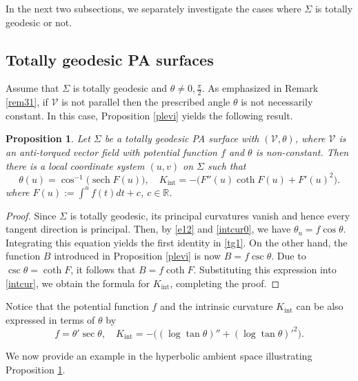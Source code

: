 \documentclass[12pt,reqno]{amsart}
\def\r{\mathbb R}
\def\v{\mathcal V}
\DeclareMathOperator{\sech}{sech}
\newtheorem{proposition}[theorem]{Proposition}
\theoremstyle{definition}
\begin{document}
In the next two subsections, we separately investigate the cases where $\Sigma$ is totally geodesic or not.

\subsection{Totally geodesic PA surfaces} 
Assume that $\Sigma$ is totally geodesic and $\theta \neq 0,\frac{\pi}{2}$. As emphasized in Remark \ref{rem31}, if $\v$ is not parallel then the prescribed angle $\theta$ is not necessarily constant. In this case, Proposition \ref{plevi} yields the following result.

\begin{proposition}\label{tg}
Let $\Sigma$ be a totally geodesic PA surface with $(\v,\theta)$, where $\v$ is an anti-torqued vector field with potential function $f$ and $\theta$ is non-constant. Then there is a local coordinate system $(u,v)$ on $\Sigma$ such that
\begin{equation}\label{tg1}
\theta(u)=\cos^{-1}\big( \sech F(u) \big), \quad K_{\mathrm{int}}=-\big(F''(u)\coth F(u)+F'(u)^2\big).
\end{equation}
where $F(u):=\int^uf(t)dt+c$, $c\in\r$.
\end{proposition}
\begin{proof}
Since $\Sigma$ is totally geodesic, its principal curvatures vanish and hence every tangent direction is principal. Then, by \eqref{e12} and \eqref{intcur0}, we have $\theta_u=f\cos \theta$. Integrating this equation yields the first identity in \eqref{tg1}. On the other hand, the function $B$ introduced in Proposition \ref{plevi} is now $B=f\csc\theta$. Due to $\csc\theta=\coth F$, it follows that $B=f\coth F$. Substituting this expression into \eqref{intcur}, we obtain the formula for $K_{\mathrm{int}}$, completing the proof.
\end{proof}

Notice that the potential function $f$ and the intrinsic curvature $K_{\mathrm{int}}$ can be also expressed in terms of  $\theta$ by
\begin{equation*}%
f=\theta' \sec\theta, \quad K_{\mathrm{int}}=-\big((\log \tan \theta)''+(\log \tan\theta)'^2\big).
\end{equation*}

We now provide an example in the hyperbolic ambient space illustrating Proposition \ref{tg}.
\end{document}
